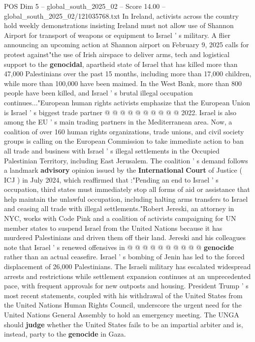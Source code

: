 \begin{textsample}{POS Dim 5 – global\_south\_2025\_02 – Score 14.00 – global\_south\_2025\_02/121035768.txt}
In Ireland, activists across the country hold weekly demonstrations insisting Ireland must not allow use of Shannon Airport for transport of weapons or equipment to Israel ' s military.
A flier announcing an upcoming action at Shannon airport on February 9, 2025 calls for protest against"the use of Irish airspace to deliver arms, tech and logistical support to the \textbf{genocidal}, apartheid state of Israel that has killed more than 47,000 Palestinians over the past 15 months, including more than 17,000 children, while more than 100,000 have been maimed.
In the West Bank, more than 800 people have been killed, and Israel ' s brutal illegal occupation continues..."European human rights activists emphasize that the European Union is Israel ' s biggest trade partner @ @ @ @ @ @ @ @ @ @ 2022.
Israel is also among the EU ' s main trading partners in the Mediterranean area.
Now, a coalition of over 160 human rights organizations, trade unions, and civil society groups is calling on the European Commission to take immediate action to ban all trade and business with Israel ' s illegal settlements in the Occupied Palestinian Territory, including East Jerusalem.
The coalition ' s demand follows a landmark \textbf{advisory} opinion issued by the \textbf{International} \textbf{Court} of Justice ( ICJ ) in July 2024, which reaffirmed that :"Pending an end to Israel ' s occupation, third states must immediately stop all forms of aid or assistance that help maintain the unlawful occupation, including halting arms transfers to Israel and ceasing all trade with illegal settlements."Robert Jereski, an attorney in NYC, works with Code Pink and a coalition of activists campaigning for UN member states to suspend Israel from the United Nations because it has murdered Palestinians and driven them off their land.
Jereski and his colleagues note that Israel ' s renewed offensives in @ @ @ @ @ @ @ @ @ @ \textbf{genocide} rather than an actual ceasefire.
Israel ' s bombing of Jenin has led to the forced displacement of 26,000 Palestinians.
The Israeli military has escalated widespread arrests and restrictions while settlement expansion continues at an unprecedented pace, with frequent approvals for new outposts and housing.
President Trump ' s most recent statements, coupled with his withdrawal of the United States from the United Nations Human Rights Council, underscore the urgent need for the United Nations General Assembly to hold an emergency meeting.
The UNGA should \textbf{judge} whether the United States fails to be an impartial arbiter and is, instead, party to the \textbf{genocide} in Gaza.

\end{textsample}
